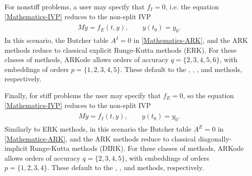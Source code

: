\documentclass[letterpaper,10pt,english]{sphinxmanual}
\begin{document}
For nonstiff problems, a user may specify that \(f_I = 0\),
i.e. the equation \eqref{Mathematics-IVP} reduces to the non-split IVP
\label{Mathematics:equation-IVP_explicit}\begin{gather}
\begin{split}M\dot{y} = f_E(t,y), \qquad y(t_0) = y_0.\end{split}\label{Mathematics-IVP_explicit}
\end{gather}
In this scenario, the Butcher table \(A^I=0\) in \eqref{Mathematics-ARK}, and
the ARK methods reduce to classical explicit Runge-Kutta
methods (ERK).  For these classes of methods, ARKode allows orders of
accuracy \(q = \{2,3,4,5,6\}\), with embeddings of orders \(p
= \{1,2,3,4,5\}\).  These default to the {\hyperref[Butcher:butcher-heun-euler]{\emph{}}},
{\hyperref[Butcher:butcher-bogacki-shampine]{\emph{}}}, {\hyperref[Butcher:butcher-zonneveld]{\emph{}}},
{\hyperref[Butcher:butcher-cash-karp]{\emph{}}} and {\hyperref[Butcher:butcher-verner-6-5]{\emph{}}} methods,
respectively.

Finally, for stiff problems the user may specify that \(f_E = 0\),
so the equation \eqref{Mathematics-IVP} reduces to the non-split IVP
\label{Mathematics:equation-IVP_implicit}\begin{gather}
\begin{split}M\dot{y} = f_I(t,y), \qquad y(t_0) = y_0.\end{split}\label{Mathematics-IVP_implicit}
\end{gather}
Similarly to ERK methods, in this scenario the Butcher table
\(A^E=0\) in \eqref{Mathematics-ARK}, and the ARK methods reduce to classical
diagonally-implicit Runge-Kutta methods (DIRK).  For these
classes of methods, ARKode allows orders of accuracy \(q =
\{2,3,4,5\}\), with embeddings of orders \(p = \{1,2,3,4\}\).
These default to the {\hyperref[Butcher:butcher-sdirk-2-1]{\emph{}}},
{\hyperref[Butcher:butcher-ark-4-2-3-i]{\emph{}}}, {\hyperref[Butcher:butcher-sdirk-5-4]{\emph{}}} and
{\hyperref[Butcher:butcher-ark-8-4-5-i]{\emph{}}} methods, respectively.
\end{document}
